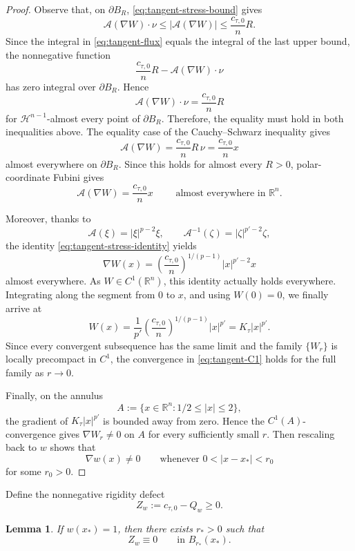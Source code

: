 \documentclass[reqno,12pt]{amsart}
\numberwithin{equation}{section}
\newtheorem{lem}[thm]{Lemma}
\theoremstyle{remark}
\newcommand{\R}{\mathbb R}
\newcommand{\Acal}{\mathcal A}
\begin{document}
\begin{proof}
Observe that, on $\partial B_R$, \eqref{eq:tangent-stress-bound} gives
$$
\Acal(\nabla W)\cdot\nu \le |\Acal(\nabla W)|\le \frac{c_{\tau,0}}nR.
$$
Since the integral in \eqref{eq:tangent-flux} equals the
integral of the last upper bound, the nonnegative function
$$
\frac{c_{\tau,0}}nR -\Acal(\nabla W)\cdot\nu
$$
has zero integral over $\partial B_R$.  Hence
$$
\Acal(\nabla W)\cdot\nu =\frac{c_{\tau,0}}nR
$$
for $\mathcal H^{n-1}$-almost every point of
$\partial B_R$.
Therefore, the equality must hold in both inequalities above. The equality case of the Cauchy--Schwarz inequality gives
$$
\Acal(\nabla W) = \frac{c_{\tau,0}}nR\,\nu
= \frac{c_{\tau,0}}n x
$$
almost everywhere on $\partial B_R$.
Since this holds for almost every $R>0$, polar-coordinate
Fubini gives
\begin{equation}\label{eq:tangent-stress-identity}
\Acal(\nabla W) =\frac{c_{\tau,0}}n x \qquad \text{ almost everywhere in }\R^n.
\end{equation}

 
Moreover, thanks to 
$$
\Acal(\xi)=|\xi|^{p-2}\xi, \qquad \Acal^{-1}(\zeta)=|\zeta|^{p'-2}\zeta,
$$
the identity \eqref{eq:tangent-stress-identity} yields
$$
\nabla W(x) =\left(\frac{c_{\tau,0}}n\right)^{1/(p-1)}
    |x|^{p'-2}x
$$
almost everywhere.  As $W\in C^1(\R^n)$, this identity actually holds everywhere.  Integrating along the segment from $0$ to $x$, and using $W(0)=0$, we finally arrive at
$$
W(x) = \frac1 {p'} \left(\frac{c_{\tau,0}}n\right)^{1/(p-1)} |x|^{p'} = K_\tau|x|^{p'}.
$$
Since every convergent subsequence has the same limit and the
family $\{W_r\}$ is locally precompact in $C^1$, the
convergence in \eqref{eq:tangent-C1} holds for the full family
as $r\to 0$.

Finally, on the annulus
$$
    A:=\{x\in\R^n:1/2\le|x|\le2\},
$$
the gradient of $K_\tau|x|^{p'}$ is bounded away from zero.
Hence the $C^1(A)$-convergence gives
$\nabla W_r\ne 0$ on $A$
for every sufficiently small $r$.
Then rescaling back to $w$ shows that
$$
 \nabla w(x)\ne 0 \qquad \text{whenever }0<|x-x_*|<r_0
$$
for some $r_0>0$.
\end{proof}

Define the nonnegative rigidity defect
\begin{equation}\label{eq:defn-Zw}
Z_w:=c_{\tau,0}-Q_w\ge0.
\end{equation}

\begin{lem}
\label{lem:local-Z-vanishing}
If $w(x_*)=1$, then there exists $r_*>0$ such that
$$
    Z_w\equiv0 \qquad\text{in }B_{r_*}(x_*).
$$
\end{lem}
\end{document}
